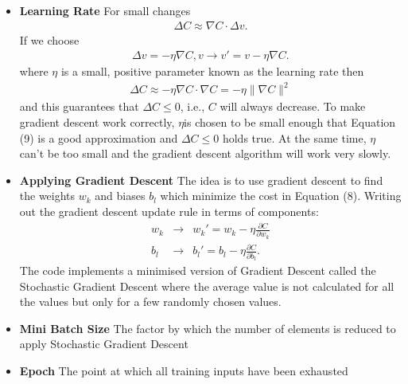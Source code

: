 \documentclass[a4paper, oneside,11pt]{article}
\begin{document}
\begin{itemize}
	\item \textbf{Learning Rate}
		For small changes
		\begin{eqnarray} 
		  \Delta C \approx \nabla C \cdot \Delta v.
		\end{eqnarray}
		If we choose
		\begin{eqnarray} 
		  \Delta v = -\eta \nabla C,
		  v \rightarrow v' = v-\eta \nabla C.
		\end{eqnarray}
		where \begin{math}\eta\end{math} is a small, positive parameter known as the learning rate then
		\begin{eqnarray}
		  \Delta C \approx -\eta
		  \nabla C \cdot \nabla C = -\eta \|\nabla C\|^2
		\end{eqnarray}
		and this guarantees that \begin{math}\Delta C \leq 0\end{math}, i.e., \begin{math}C\end{math} will always decrease. To make gradient descent work correctly, \begin{math}\eta\end{math}is chosen to be small enough that Equation (9) is a good approximation and \begin{math}\Delta C \leq 0\end{math} holds true. At the same time, \begin{math}\eta\end{math} can't be too small and the gradient descent algorithm will work very slowly.

	\item \textbf{Applying Gradient Descent}
		The idea is to use gradient descent to find the weights \begin{math}w_k\end{math} and biases \begin{math}b_l\end{math} which minimize the cost in Equation (8). Writing out the gradient descent update rule in terms of components:
		\begin{eqnarray}
		  w_k & \rightarrow & w_k' = w_k-\eta \frac{\partial C}{\partial w_k} \\
		  b_l & \rightarrow & b_l' = b_l-\eta \frac{\partial C}{\partial b_l}.
		\end{eqnarray}
		The code implements a minimised version of Gradient Descent called the Stochastic Gradient Descent where the average value is not calculated for all the values but only for a few randomly chosen values.
	\item \textbf{Mini Batch Size}
		The factor by which the number of elements is reduced to apply Stochastic Gradient Descent
	\item \textbf{Epoch}
		The point at which all training inputs have been exhausted
\end{itemize}

\printbibliography 
\end{document}
